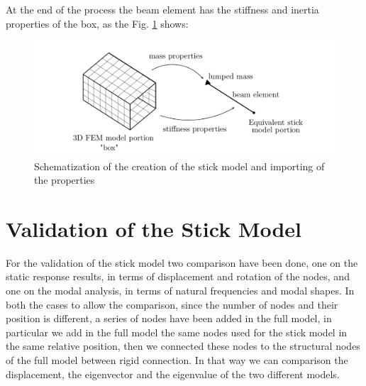 At the end of the process the beam element has the stiffness and inertia properties of the box, as the Fig. \ref{fig:4_6} shows:
\begin{figure}[H]
	\centering
	\includegraphics[width = 1\textwidth]{./Immagini/4_6.png}
	\caption{Schematization of the creation of the stick model and importing of the properties}
	\label{fig:4_6}
\end{figure}
\section{Validation of the Stick Model}
For the validation of the stick model two comparison have been done, one on the static response results, in terms of displacement and rotation of the nodes, and one on the modal analysis, in terms of natural frequencies and modal shapes. In both the cases to allow the comparison, since the number of nodes and their position is different, a series of nodes have been added in the full model, in particular we add in the full model the same nodes used for the stick model in the same relative position, then we connected these nodes to the structural nodes of the full model between rigid connection. In that way we can comparison the displacement, the eigenvector and the eigenvalue of the two different models.
